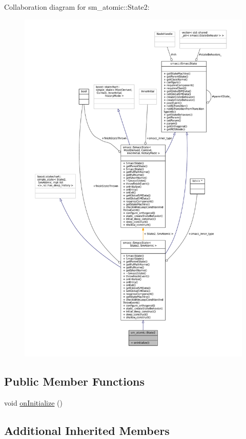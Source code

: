 Collaboration diagram for sm\+\_\+atomic\+:\+:State2\+:
\nopagebreak
\begin{figure}[H]
\begin{center}
\leavevmode
\includegraphics[width=350pt]{structsm__atomic_1_1State2__coll__graph}
\end{center}
\end{figure}
\subsection*{Public Member Functions}
\begin{DoxyCompactItemize}
\item 
void \hyperlink{structsm__atomic_1_1State2_abb160f6c17f43949566c5bf6fd352862}{on\+Initialize} ()
\end{DoxyCompactItemize}
\subsection*{Additional Inherited Members}


